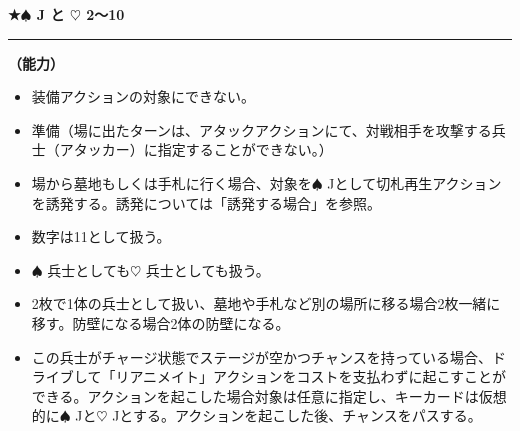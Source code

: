 \documentclass[twocolumn,a5paper,papersize,10pt]{jarticle}
\begin{document}
\vspace{-1zh}
  
\vspace{2mm}
\begin{tcolorbox}[title={\small\bf【Character】リアニメーター}{\scriptsize （兵士）}]

  {\scriptsize\bf ★{\normalsize $\spadesuit$} J と {\normalsize $\heartsuit$} 2〜10}

\vspace{1mm} %
\hrule height 0.1mm depth 0mm width 62mm %
\vspace{1mm} %

{\bf（能力）}


\vspace{-1zh}%
\begin{itemize}
\setlength{\leftskip}{-0.3cm}
\setlength{\parskip}{0pt} %

\item 装備アクションの対象にできない。

\item 準備（場に出たターンは、アタックアクションにて、対戦相手を攻撃する兵士（アタッカー）に指定することができない。）

\item 場から墓地もしくは手札に行く場合、対象を{\normalsize $\spadesuit$} Jとして切札再生アクションを誘発する。誘発については「誘発する場合」を参照。

\item 数字は11として扱う。

\item {\normalsize $\spadesuit$} 兵士としても{\normalsize $\heartsuit$} 兵士としても扱う。

\item 2枚で1体の兵士として扱い、墓地や手札など別の場所に移る場合2枚一緒に移す。防壁になる場合2体の防壁になる。

\item この兵士がチャージ状態でステージが空かつチャンスを持っている場合、ドライブして「リアニメイト」アクションをコストを支払わずに起こすことができる。アクションを起こした場合対象は任意に指定し、キーカードは仮想的に{\normalsize $\spadesuit$} Jと{\normalsize $\heartsuit$} Jとする。アクションを起こした後、チャンスをパスする。
\vspace{-1zh}%
\end{itemize}

\vspace{1mm} %
\end{tcolorbox}
\end{document}
